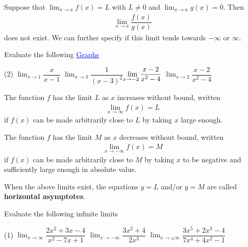 \documentclass[../mathNotesPreamble]{subfiles}
\begin{document}
  \noindent
  Suppose that $\displaystyle \lim_{x\to a} f(x)=L$ with $L\neq 0$ and $\displaystyle \lim_{x\to a} g(x)=0$. Then
  \begin{align*}
    \lim_{x\to a} \dfrac{f(x)}{g(x)}
  \end{align*}
  does not exist. We can further specify if this limit tends towards
  $-\infty$ or $\infty$.

  \begin{ex*}
    Evaluate the following \hfill \href{https://www.desmos.com/calculator/svhfldwwmo}{\textcolor{blue}{\underline{Graphs}}}
  \end{ex*}
  \begin{extasks}[after-item-skip=\stretch{1}](2)
    \task $\displaystyle \lim_{x\to 1} \dfrac{x}{x-1}$
    \task $\displaystyle \lim_{x\to 3} \dfrac{1}{(x-3)^2}$
    \task $\displaystyle \lim_{\mathllap{x}\to -2} \dfrac{x-2}{x^2-4}$
    \task $\displaystyle \lim_{x\to 2} \dfrac{x-2}{x^2-4}$
  \end{extasks}
  \pagebreak

  \begin{thmBox*}
    The function $f$ has the limit $L$ as $x$ increases without bound, written
    \begin{align*}
      \lim_{x\to \infty} f(x)=L
    \end{align*}
    if $f(x)$ can be made arbitrarily close to $L$ by taking $x$ large enough.

    The function $f$ has the limit $M$ as $x$ decreases without bound, written
    \begin{align*}
      \lim_{x\to -\infty} f(x)=M
    \end{align*}
    if $f(x)$ can be made arbitrarily close to $M$ by taking $x$ to be negative and sufficiently large enough in absolute value.

    When the above limits exist, the equations $y=L$ and/or $y=M$ are called \textbf{horizontal asymptotes}.
  \end{thmBox*}
  \begin{ex*}
    Evaluate the following infinite limits
  \end{ex*}
  \begin{extasks}[after-item-skip=\stretch{1}](1)
    \task $\displaystyle \lim_{x\to \infty} \dfrac{2x^2+3x-4}{x^2-7x+1}$
    \task $\displaystyle \lim_{x\to -\infty} \dfrac{3x^2+4}{2x^3}$
    \task $\displaystyle \lim_{x\to \pm\infty} \dfrac{3x^5+2x^3-4}{7x^4+4x^2-1}$
  \end{extasks}
  \pagebreak
\end{document}
